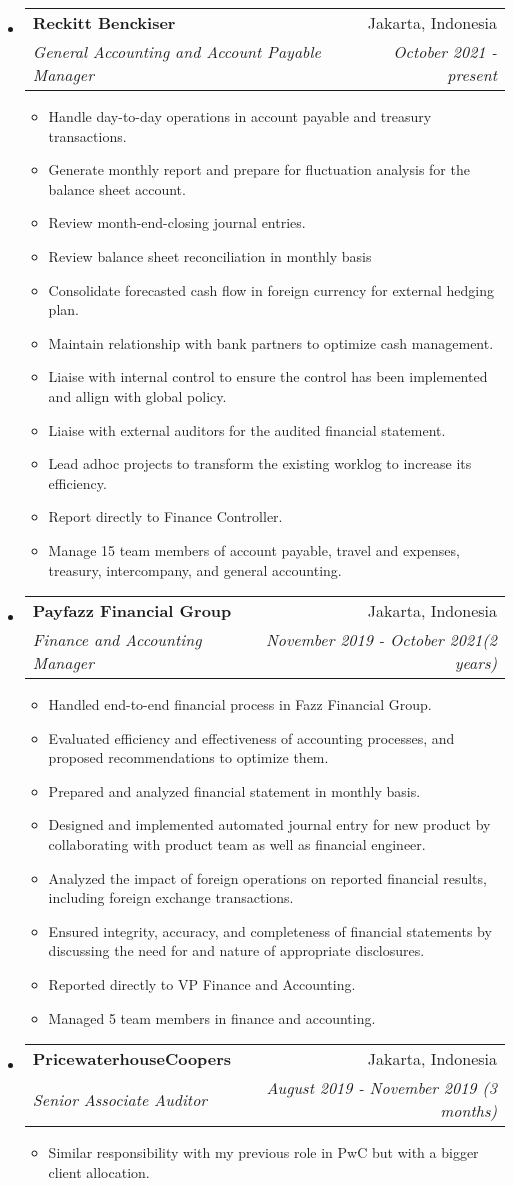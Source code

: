 \documentclass[letterpaper,10pt]{article}
\makeatletter
\newcommand{\resitem}[1]{\item #1 \vspace{-2pt}}
\newcommand{\ressubheading}[4]{
\begin{tabular*}{6.5in}{l@{\cftdotfill{\cftsecdotsep}\extracolsep{\fill}}r}
		\textbf{#1} & #2 \\
		\textit{#3} & \textit{#4} \\
\end{tabular*}\vspace{-6pt}}
\makeatother
\begin{document}
\begin{itemize}

  \item
  \ressubheading{Reckitt Benckiser}{Jakarta, Indonesia}{General Accounting and Account Payable Manager}{October 2021 - present}
  \begin{itemize}
    \resitem{Handle day-to-day operations in account payable and treasury transactions.}
    \resitem{Generate monthly report and prepare for fluctuation analysis for the balance sheet account.}
    \resitem{Review month-end-closing journal entries.}
    \resitem{Review balance sheet reconciliation in monthly basis}
    \resitem{Consolidate forecasted cash flow in foreign currency for external hedging plan.}
    \resitem{Maintain relationship with bank partners to optimize cash management.}
    \resitem{Liaise with internal control to ensure the control has been implemented and allign with global policy.}
    \resitem{Liaise with external auditors for the audited financial statement.}
    \resitem{Lead adhoc projects to transform the existing worklog to increase its efficiency.}
    \resitem{Report directly to Finance Controller.}
    \resitem{Manage 15 team members of account payable, travel and expenses, treasury, intercompany, and general accounting.}
  \end{itemize}

  \item 
  \ressubheading{Payfazz Financial Group}{Jakarta, Indonesia}{Finance and Accounting Manager}{November 2019 - October 2021(2 years)}
  \begin{itemize}
    \resitem{Handled end-to-end financial process in Fazz Financial Group.}
    \resitem{Evaluated efficiency and effectiveness of accounting processes, and proposed recommendations to optimize them.}
    \resitem{Prepared and analyzed financial statement in monthly basis.}
    \resitem{Designed and implemented automated journal entry for new product by collaborating with product team as well as financial engineer.}
    \resitem{Analyzed the impact of foreign operations on reported financial results, including foreign exchange transactions.}
    \resitem{Ensured integrity, accuracy, and completeness of financial statements by discussing the need for and nature of appropriate disclosures.}
    \resitem{Reported directly to VP Finance and Accounting.}
    \resitem{Managed 5 team members in finance and accounting.} 
  \end{itemize}

\item 
\ressubheading{PricewaterhouseCoopers}{Jakarta, Indonesia}{Senior Associate Auditor}{August 2019 - November 2019 (3 months)}
\begin{itemize}
  \resitem{Similar responsibility with my previous role in PwC but with a bigger client allocation.}
\end{itemize}


\end{itemize}
\end{document}
